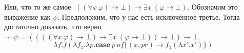 \begin{enumerate}
\begin{enumerate}
Или, что то же самое:  $((\forall x\ \varphi) \to \bot) \to \exists x\ (\varphi \to \bot)$. Обозначим это 
выражение как $\psi$. Предположим, что у нас есть исключённое третье. Тогда достаточно доказать, что верно $\neg 
\neg \psi = ((((\forall x\ \varphi) \to \bot) \to \exists x\ (\varphi \to \bot)) \to \bot) \to \bot$.
\begin{equation*}
	\lambda f. f (\lambda f_1.\lambda p. \mathbf{case} \ p \ of \{ (x, pr) \to f_1 (\lambda x'.x') \})
\end{equation*}
\end{enumerate}

\end{enumerate}

